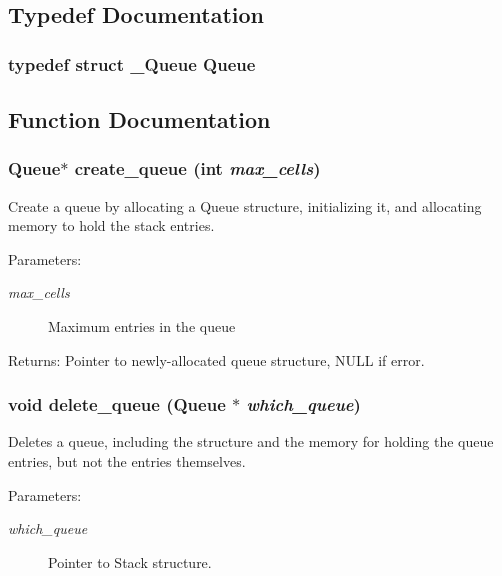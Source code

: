 \subsection{Typedef Documentation}
\subsubsection{\setlength{\rightskip}{0pt plus 5cm}typedef struct \bf{\_\-Queue} \bf{Queue}}\label{queue_8h_aa31d02f2b2876d12bb8f83900eacce6}




\subsection{Function Documentation}
\subsubsection{\setlength{\rightskip}{0pt plus 5cm}\bf{Queue}$\ast$ create\_\-queue (int {\em max\_\-cells})}\label{queue_8h_37f0ebf6bb3301f99bc42638a41ab12e}


Create a queue by allocating a Queue structure, initializing it, and allocating memory to hold the stack entries. \begin{Desc}
\item[Parameters:]
\begin{description}
\item[{\em max\_\-cells}]Maximum entries in the queue \end{description}
\end{Desc}
\begin{Desc}
\item[Returns:]Pointer to newly-allocated queue structure, NULL if error. \end{Desc}
\subsubsection{\setlength{\rightskip}{0pt plus 5cm}void delete\_\-queue (\bf{Queue} $\ast$ {\em which\_\-queue})}\label{queue_8h_b43c6f0104078cd018e97703f7b95ba7}


Deletes a queue, including the structure and the memory for holding the queue entries, but not the entries themselves. \begin{Desc}
\item[Parameters:]
\begin{description}
\item[{\em which\_\-queue}]Pointer to Stack structure. \end{description}
\end{Desc}
